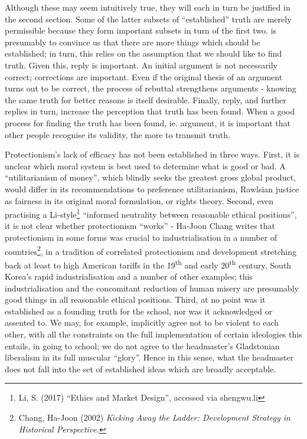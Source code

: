 \documentclass[12pt,a4paper]{report}
\newcounter{count}
\begin{document}
\begin{multicols}{2}
\begin{multicols}{2}
{	Although these may seem intuitively true, they will each in turn be
	justified in the second section. Some of the latter subsets of
	``established'' truth are merely permissible because they form
	important subsets in turn of the first two.} is presumably to convince
us that there are more things which should be established; in turn, this
relies on the assumption that we should like to find truth. Given this,
reply is important. An initial argument is not necessarily correct;
corrections are important. Even if the original thesis of an argument
turns out to be correct, the process of rebuttal strengthens arguments -
knowing the same truth for better reasons is itself desirable. Finally,
reply, and further replies in turn, increase the perception that truth
has been found. When a good process for finding the truth has been
found, ie. argument, it is important that other people recognise its
validity, the more to transmit truth.

Protectionism's lack of efficacy has not been established in three ways.
First, it is unclear which moral system is best used to determine what
is good or bad. A ``utilitarianism of money'', which blindly seeks the
greatest gross global product, would differ in its recommendations to
preference utilitarianism, Rawlsian justice as fairness in its original
moral formulation, or rights theory. Second, even practising a
Li-style\footnote{Li, S. (2017) ``Ethics and Market Design'', accessed
	via shengwu.li} ``informed neutrality between reasonable ethical
positions'', it is not clear whether protectionism ``works'' - Ha-Joon
Chang writes that protectionism in some forms was crucial to
industrialisation in a number of countries\footnote{Chang, Ha-Joon
	(2002) \textit{Kicking Away the Ladder: Development Strategy in
		Historical Perspective.}}, in a tradition of correlated protectionism
and development stretching back at least to high American tariffs in the
19\textsuperscript{th} and early 20\textsuperscript{th} century, South
Korea's rapid industrialisation and a number of other examples; this
industrialisation and the concomitant reduction of human misery are
presumably good things in all reasonable ethical positions. Third, at no
point was it established as a founding truth for the school, nor was it
acknowledged or assented to. We may, for example, implicitly agree not
to be violent to each other, with all the constraints on the full
implementation of certain ideologies this entails, in going to school;
we do not agree to the headmaster's Gladstonian liberalism in its full
muscular ``glory''. Hence in this sense, what the headmaster does not
fall into the set of established ideas which are broadly acceptable.


\end{multicols}
\end{multicols}
\end{document}
